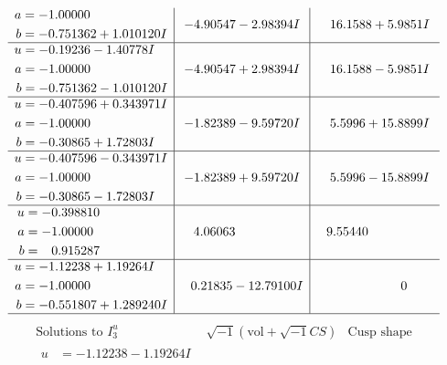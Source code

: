 \documentclass[1p]{elsarticle_modified}
\theoremstyle{definition}
\newcommand{\I}{\sqrt{-1}}
\begin{document}
$$\begin{array}{c|c|c}
\begin{aligned}
a &= -1.00000\phantom{ +0.000000I} \\
b &= -0.751362 + 1.010120 I\end{aligned}
 & -4.90547 - 2.98394 I & \phantom{-}16.1588 + 5.9851 I \\ \hline\begin{aligned}
u &= -0.19236 - 1.40778 I \\
a &= -1.00000\phantom{ +0.000000I} \\
b &= -0.751362 - 1.010120 I\end{aligned}
 & -4.90547 + 2.98394 I & \phantom{-}16.1588 - 5.9851 I \\ \hline\begin{aligned}
u &= -0.407596 + 0.343971 I \\
a &= -1.00000\phantom{ +0.000000I} \\
b &= -0.30865 + 1.72803 I\end{aligned}
 & -1.82389 - 9.59720 I & \phantom{-}5.5996 + 15.8899 I \\ \hline\begin{aligned}
u &= -0.407596 - 0.343971 I \\
a &= -1.00000\phantom{ +0.000000I} \\
b &= -0.30865 - 1.72803 I\end{aligned}
 & -1.82389 + 9.59720 I & \phantom{-}5.5996 - 15.8899 I \\ \hline\begin{aligned}
u &= -0.398810\phantom{ +0.000000I} \\
a &= -1.00000\phantom{ +0.000000I} \\
b &= \phantom{-}0.915287\phantom{ +0.000000I}\end{aligned}
 & \phantom{-}4.06063\phantom{ +0.000000I} & \phantom{-}9.55440\phantom{ +0.000000I} \\ \hline\begin{aligned}
u &= -1.12238 + 1.19264 I \\
a &= -1.00000\phantom{ +0.000000I} \\
b &= -0.551807 + 1.289240 I\end{aligned}
 & \phantom{-}0.21835 - 12.79100 I & \phantom{-0.000000 } 0\\
 \hline 
 \end{array}$$\newpage$$\begin{array}{c|c|c}  
\text{Solutions to }I^u_{3}& \I (\text{vol} + \sqrt{-1}CS) & \text{Cusp shape}\\
 \hline 
\begin{aligned}
u &= -1.12238 - 1.19264 I \\

\end{aligned}
\end{array}$$
\end{document}
